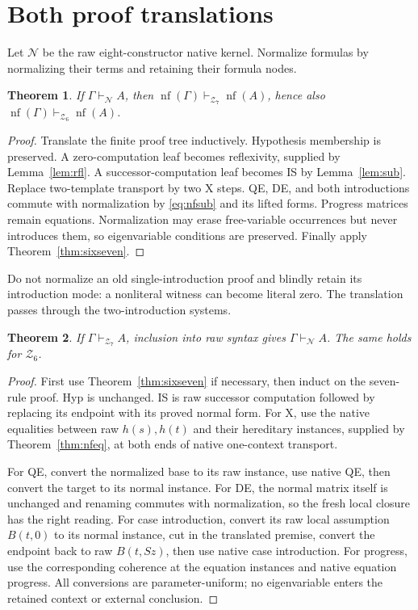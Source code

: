 \documentclass[11pt]{article}
\newtheorem{theorem}{Theorem}[section]
\newcommand{\N}{\mathcal N}
\newcommand{\Zsix}{\mathcal Z_6}
\newcommand{\Zseven}{\mathcal Z_7}
\newcommand{\nf}{\operatorname{nf}}\newcommand{\It}{\widehat I}
\begin{document}
\section{Both proof translations}\label{sec:translations}
Let \(\N\) be the raw eight-constructor native kernel. Normalize
formulas by normalizing their terms and retaining their formula nodes.

\begin{theorem}\label{thm:oldnew}
If \(\Gamma\vdash_\N A\), then
\(\nf(\Gamma)\vdash_{\Zseven}\nf(A)\), hence also
\(\nf(\Gamma)\vdash_{\Zsix}\nf(A)\).
\end{theorem}
\begin{proof}
Translate the finite proof tree inductively.
Hypothesis membership is preserved.
A zero-computation leaf becomes reflexivity, supplied by
Lemma~\ref{lem:rfl}. A successor-computation leaf becomes IS by
Lemma~\ref{lem:sub}. Replace two-template transport by two X steps.
QE, DE, and both introductions commute with normalization by
\eqref{eq:nfsub} and its lifted forms. Progress matrices remain
equations. Normalization may erase free-variable occurrences but
never introduces them, so eigenvariable conditions are preserved.
Finally apply Theorem~\ref{thm:sixseven}.
\end{proof}

Do not normalize an old single-introduction proof and blindly retain
its introduction mode: a nonliteral witness can become literal zero.
The translation passes through the two-introduction systems.

\begin{theorem}\label{thm:newold}
If \(\Gamma\vdash_{\Zseven}A\), inclusion into raw syntax gives
\(\Gamma\vdash_\N A\). The same holds for \(\Zsix\).
\end{theorem}
\begin{proof}
First use Theorem~\ref{thm:sixseven} if necessary, then induct on the
seven-rule proof.
Hyp is unchanged. IS is raw successor computation followed by
replacing its endpoint with its proved normal form.
For X, use the native equalities between raw \(h(s),h(t)\) and their
hereditary instances, supplied by Theorem~\ref{thm:nfeq}, at both
ends of native one-context transport.

For QE, convert the normalized base to its raw instance, use native
QE, then convert the target to its normal instance.
For DE, the normal matrix itself is unchanged and renaming commutes
with normalization, so the fresh local closure has the right reading.
For case introduction, convert its raw local assumption \(B(t,0)\)
to its normal instance, cut in the translated premise, convert the
endpoint back to raw \(B(t,Sz)\), then use native case introduction.
For progress, use the corresponding coherence at the equation
instances and native equation progress.
All conversions are parameter-uniform; no eigenvariable enters the
retained context or external conclusion.
\end{proof}
\end{document}
